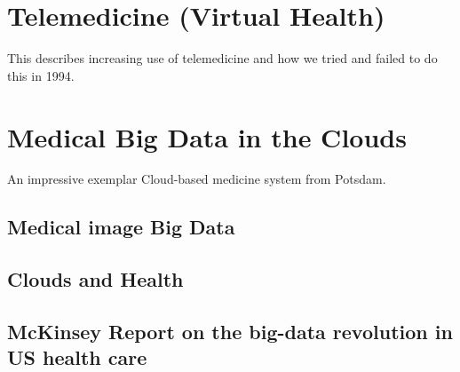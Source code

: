 
\section{Telemedicine (Virtual Health)}

This describes increasing use of telemedicine and how we tried and
failed to do this in 1994.


\begin{comment}
\section{Big Data and Healthcare Industry}

Summary of an industry survey by GE and Accenture.

\video{Health}{10:02}{Big Data and Healthcare Indusry}{https://www.youtube.com/watch?v=64YOUnRJVZU}
\end{comment}

\section{Medical Big Data in the Clouds}

An impressive exemplar Cloud-based medicine system from Potsdam.



\subsection{Medical image Big Data}\label{medical-image-big-data}


\subsection{Clouds and Health}\label{clouds-and-health}



\subsection{McKinsey Report on the big-data revolution in US health
  care}

